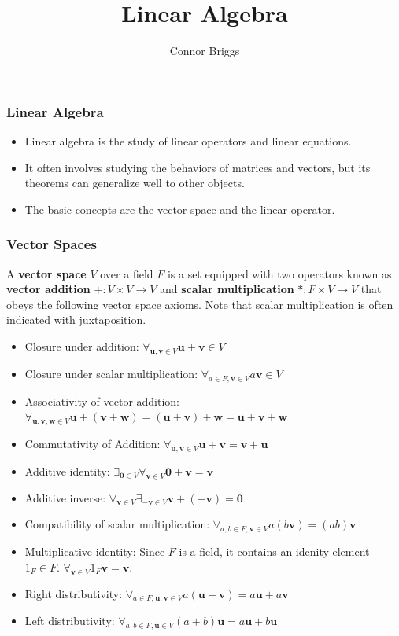 \documentclass[10pt]{beamer}
\title{Linear Algebra}
\author{Connor Briggs}
\begin{document}
\maketitle

\begin{frame}
  \frametitle{Linear Algebra}
  \begin{itemize}
  \item Linear algebra is the study of linear operators and linear equations.
  \item It often involves studying the behaviors of matrices and vectors, but its theorems can generalize well to other objects.
  \item The basic concepts are the vector space and the linear operator.
  \end{itemize}
\end{frame}

\begin{frame}
  \frametitle{Vector Spaces}
  A \textbf{vector space} $V$ over a field $F$ is a set equipped with two operators known as \textbf{vector addition} $+: V\times V\rightarrow V$ and \textbf{scalar multiplication} $*:F\times V\rightarrow V$ that obeys the following vector space axioms. Note that scalar multiplication is often indicated with juxtaposition.
  \begin{itemize}
  \item Closure under addition: $\forall_{\mathbf{u},\mathbf{v}\in V}\mathbf{u} + \mathbf{v} \in V$
  \item Closure under scalar multiplication: $\forall_{a\in F, \mathbf{v}\in V}a\mathbf{v} \in V$
  \item Associativity of vector addition: $\forall_{\mathbf{u},\mathbf{v},\mathbf{w}\in V} \mathbf{u} + (\mathbf{v} + \mathbf{w}) = (\mathbf{u} + \mathbf{v}) + \mathbf{w} = \mathbf{u} + \mathbf{v} + \mathbf{w}$
  \item Commutativity of Addition: $\forall_{\mathbf{u},\mathbf{v}\in V} \mathbf{u} + \mathbf{v} = \mathbf{v} + \mathbf{u}$
  \item Additive identity: $\exists_{\mathbf{0}\in V}\forall_{\mathbf{v}\in V}\mathbf{0} + \mathbf{v} = \mathbf{v}$
  \item Additive inverse: $\forall_{\mathbf{v}\in V}\exists_{-\mathbf{v}\in V}\mathbf{v} + (-\mathbf{v}) = \mathbf{0}$
  \item Compatibility of scalar multiplication: $\forall_{a,b\in F, \mathbf{v}\in V}a(b\mathbf{v}) = (ab)\mathbf{v}$
  \item Multiplicative identity: Since $F$ is a field, it contains an idenity element $1_F\in F$. $\forall_{\mathbf{v}\in V} 1_F\mathbf{v} = \mathbf{v}$.
  \item Right distributivity: $\forall_{a\in F,\mathbf{u}, \mathbf{v}\in V} a(\mathbf{u} + \mathbf{v}) = a\mathbf{u} + a\mathbf{v}$
  \item Left distributivity: $\forall_{a,b\in F, \mathbf{u}\in V}(a + b)\mathbf{u} = a\mathbf{u} + b\mathbf{u}$
    \end{itemize}
\end{frame}
\end{document}
